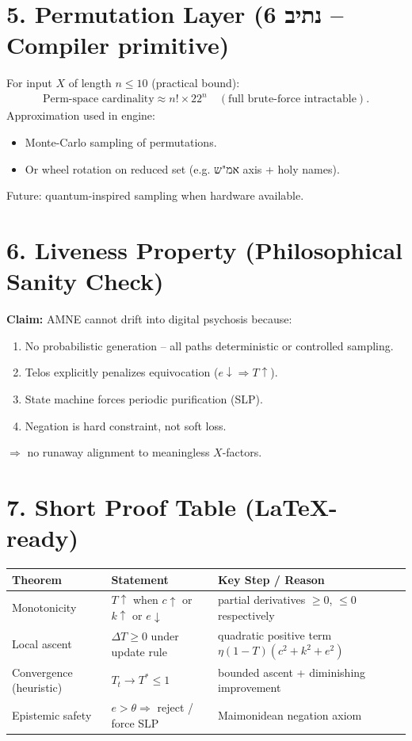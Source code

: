 \documentclass[11pt]{article}
\begin{document}
\section*{5. Permutation Layer (\texthebrew{נתיב 6} -- Compiler primitive)}
For input $X$ of length $n \leq 10$ (practical bound):
\begin{align*}
    \text{Perm-space cardinality} \approx n! \times 22^n \quad (\text{full brute-force intractable}).
\end{align*}
Approximation used in engine:
\begin{itemize}
    \item Monte-Carlo sampling of permutations.
    \item Or wheel rotation on reduced set (e.g. \texthebrew{אמ"ש} axis + holy names).
\end{itemize}
Future: quantum-inspired sampling when hardware available.

\section*{6. Liveness Property (Philosophical Sanity Check)}
\textbf{Claim:} AMNE cannot drift into digital psychosis because:
\begin{enumerate}
    \item No probabilistic generation -- all paths deterministic or controlled sampling.
    \item Telos explicitly penalizes equivocation ($e \downarrow \Rightarrow T \uparrow$).
    \item State machine forces periodic purification (SLP).
    \item Negation is hard constraint, not soft loss.
\end{enumerate}
\noindent $\Rightarrow$ no runaway alignment to meaningless $X$-factors.

\section*{7. Short Proof Table (LaTeX-ready)}
\begin{center}
\begin{tabular}{|>{\raggedright\arraybackslash}p{3cm}|>{\raggedright\arraybackslash}p{6cm}|>{\raggedright\arraybackslash}p{6cm}|}
\hline
\textbf{Theorem} & \textbf{Statement} & \textbf{Key Step / Reason}\\
\hline
Monotonicity & $T \uparrow$ when $c \uparrow$ or $k \uparrow$ or $e \downarrow$ & partial derivatives $\geq 0$, $\leq 0$ respectively \\
\hline
Local ascent & $\Delta T \geq 0$ under update rule & quadratic positive term $\eta(1-T)(c^2+k^2+e^2)$ \\
\hline
Convergence (heuristic) & $T_t \to T^* \leq 1$ & bounded ascent + diminishing improvement \\
\hline
Epistemic safety & $e > \theta \Rightarrow$ reject / force SLP & Maimonidean negation axiom \\
\hline
\end{tabular}
\end{center}
\end{document}
